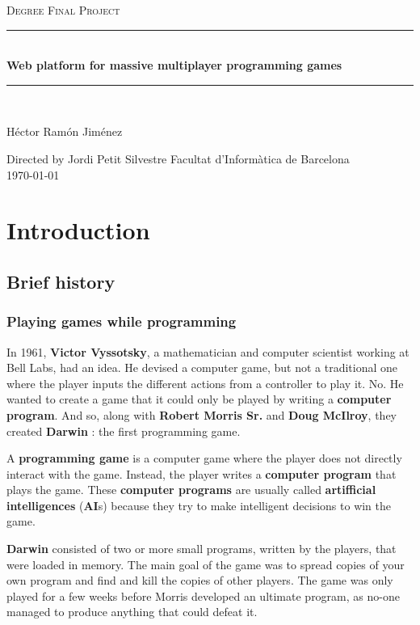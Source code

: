 \documentclass[a4paper,11pt,titlepage,abstract,numbers=noenddot,automark,mnsy,intlimits,rgb,dvipsnames]{report}
\begin{document}
\begin{titlepage}
\begin{center}
\textsc{\Large Degree Final Project}
\\[1.5cm]
\rule{\linewidth}{0.5mm}
\\[0.4cm]
{\huge
\bfseries
Web platform for massive multiplayer programming games
\\[0.4cm]
}
\rule{\linewidth}{0.5mm}
\\[2.5cm]
\begin{center}
\large
Héctor Ramón Jiménez
\end{center}
Directed by Jordi Petit Silvestre
\vfill
{\large
Facultat d'Informàtica de Barcelona
}
\\[0.5cm]
{\large
\today
}
\end{center}
\end{titlepage}
\clearpage
\begin{abstract}
...
\end{abstract}
\clearpage
\tableofcontents
\clearpage
\chapter{Introduction}
\section{Brief history}
\subsection{Playing games while programming}
In 1961, \textbf{Victor Vyssotsky}, a mathematician and computer scientist working at Bell Labs, had an idea. He devised
a computer game, but not a traditional one where the player inputs the different actions from a controller to play it.
No. He wanted to create a game that it could only be played by writing a \textbf{computer program}. And so, along with \textbf{Robert
Morris Sr.} and \textbf{Doug McIlroy}, they created \textbf{Darwin} \cite{darwin}: the first programming game.

A \textbf{programming game} is a computer game where the player does not directly interact with the game. Instead, the
player writes a \textbf{computer program} that plays the game. These \textbf{computer programs} are usually called \textbf{artifficial
intelligences} (\textbf{AI}s) because they try to make intelligent decisions to win the game.

\textbf{Darwin} consisted of two or more small programs, written by the players, that were loaded in memory. The main goal
of the game was to spread copies of your own program and find and kill the copies of other players. The game was only
played for a few weeks before Morris developed an ultimate program, as no-one managed to produce anything that could
defeat it.
\end{document}
